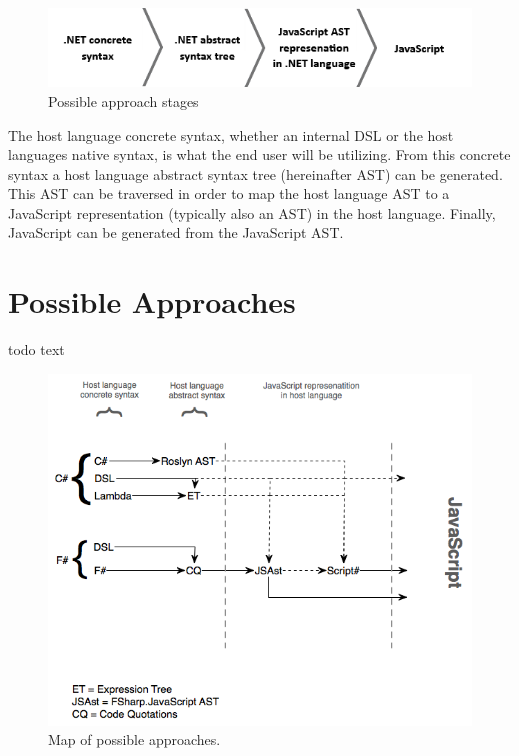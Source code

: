 				\begin{figure}[H]
			\begin{center}
				\centerline{\includegraphics[width=12cm]{resources/images/stages.png}}
			\end{center}
			\caption{Possible approach stages}
			\label{stages}
		\end{figure}

	The host language concrete syntax, whether an internal DSL or the host languages native syntax, is what the end user will be utilizing. From this concrete syntax a host language abstract syntax tree (hereinafter AST) can be generated. This AST can be traversed in order to map the host language AST to a JavaScript representation (typically also an AST) in the host language. Finally, JavaScript can be generated from the JavaScript AST.

\section{Possible Approaches} %
\label{sec:possible_approaches}
	todo text

					\begin{figure}[H]
			\begin{center}
				\centerline{\includegraphics[width=14cm]{resources/images/DSLv2.png}}
			\end{center}
			\caption{Map of possible approaches.}
			\label{approachMap}
		\end{figure}


